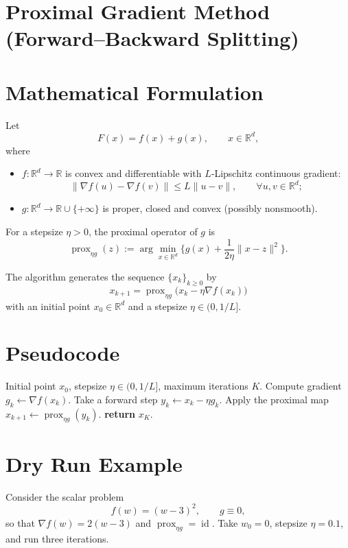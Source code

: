 \documentclass{article}
\newcommand{\prox}{\operatorname{prox}}
\newcommand{\R}{\mathbb{R}}
\begin{document}
\section*{Proximal Gradient Method (Forward–Backward Splitting)}

\section*{Mathematical Formulation}
Let 
\[
F(x)=f(x)+g(x),\qquad x\in\R^{d},
\]
where  

\begin{itemize}
    \item $f:\R^{d}\!\to\!\R$ is convex and differentiable with $L$‑Lipschitz continuous gradient:
    \[
    \|\nabla f(u)-\nabla f(v)\|\le L\|u-v\|,\qquad\forall u,v\in\R^{d};
    \]
    \item $g:\R^{d}\!\to\!\R\cup\{+\infty\}$ is proper, closed and convex (possibly nonsmooth).
\end{itemize}
For a stepsize $\eta>0$, the proximal operator of $g$ is
\[
\prox_{\eta g}(z):=\arg\min_{x\in\R^{d}}\Big\{ g(x)+\frac{1}{2\eta}\|x-z\|^{2}\Big\}.
\]

The algorithm generates the sequence $\{x_{k}\}_{k\ge0}$ by
\begin{equation}
\boxed{\,x_{k+1}= \prox_{\eta g}\!\big(x_{k}-\eta\nabla f(x_{k})\big)\,}\tag{1}
\end{equation}
with an initial point $x_{0}\in\R^{d}$ and a stepsize $\eta\in(0,1/L]$.

\section*{Pseudocode}
\begin{algorithm}[H]
\caption{Proximal Gradient Method}
\begin{algorithmic}[1]
\Require Initial point $x_{0}$, stepsize $\eta\in(0,1/L]$, maximum iterations $K$.
    \State Compute gradient $g_{k}\gets \nabla f(x_{k})$.
    \State Take a forward step $y_{k}\gets x_{k}-\eta g_{k}$.
    \State Apply the proximal map $x_{k+1}\gets \prox_{\eta g}(y_{k})$.
\EndFor
\State \textbf{return} $x_{K}$.
\end{algorithmic}
\end{algorithm}

\section*{Dry Run Example}
Consider the scalar problem 
\[
f(w)=(w-3)^{2},\qquad g\equiv0,
\]
so that $\nabla f(w)=2(w-3)$ and $\prox_{\eta g}= \operatorname{id}$.  
Take $w_{0}=0$, stepsize $\eta=0.1$, and run three iterations.
\end{document}
